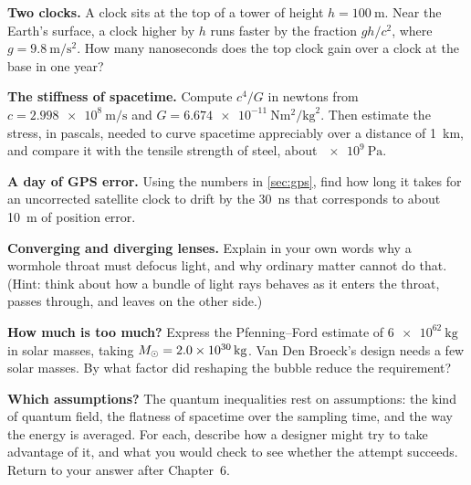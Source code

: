 \begin{problems}
\item {} \textbf{Two clocks.} A clock sits at the top of a tower of height
  $h = \SI{100}{\metre}$. Near the Earth's surface, a clock higher by $h$ runs
  faster by the fraction $gh/c^{2}$, where $g = \SI{9.8}{\metre\per\second\squared}$.
  How many nanoseconds does the top clock gain over a clock at the base in one
  year?
\item {} \textbf{The stiffness of spacetime.} Compute $c^{4}/G$ in newtons
  from $c = \SI{2.998e8}{\metre\per\second}$ and
  $G = \SI{6.674e-11}{\newton\metre\squared\per\kilogram\squared}$. Then
  estimate the stress, in pascals, needed to curve spacetime appreciably over a
  distance of \SI{1}{\kilo\metre}, and compare it with the tensile strength of
  steel, about $\SI{e9}{\pascal}$.
\item {} \textbf{A day of GPS error.} Using the numbers in
  \cref{sec:gps}, find how long it takes for an uncorrected satellite clock to
  drift by the \SI{30}{\nano\second} that corresponds to about \SI{10}{\metre}
  of position error.
\item {} \textbf{Converging and diverging lenses.} Explain in your own
  words why a wormhole throat must defocus light, and why ordinary matter
  cannot do that. (Hint: think about how a bundle of light rays behaves as it
  enters the throat, passes through, and leaves on the other side.)
\item {} \textbf{How much is too much?} Express the Pfenning–Ford estimate
  of $\SI{6e62}{\kilogram}$ in solar masses, taking
  $M_{\odot} = \SI{2.0e30}{\kilogram}$. Van Den Broeck's design needs a few solar
  masses. By what factor did reshaping the bubble reduce the requirement?
\item {} \textbf{Which assumptions?} The quantum inequalities rest on
  assumptions: the kind of quantum field, the flatness of spacetime over the
  sampling time, and the way the energy is averaged. For each, describe how a
  designer might try to take advantage of it, and what you would check to see
  whether the attempt succeeds. Return to your answer after
  Chapter~6.
\end{problems}

